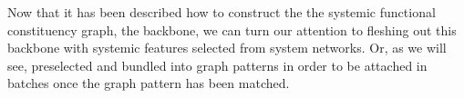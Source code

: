 Now that it has been described how to construct the the systemic functional constituency graph, the backbone, we can turn our attention to fleshing out this backbone with systemic features selected from system networks. Or, as we will see, preselected and bundled into graph patterns in order to be attached in batches once the graph pattern has been matched. 





